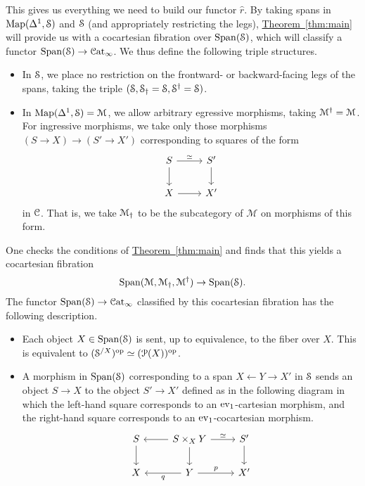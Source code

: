 \documentclass[main.tex]{subfiles}
\begin{document}
This gives us everything we need to build our functor $\hat{r}$. By taking spans in $\Map(\Delta^{1}, \S)$ and $\S$ (and appropriately restricting the legs), \hyperref[thm:main]{Theorem~\ref*{thm:main}} will provide us with a cocartesian fibration over $\Span(\S)$, which will classify a functor $\Span(\S) \to \ICat$. We thus define the following triple structures.
\begin{itemize}
  \item In $\S$, we place no restriction on the frontward- or backward-facing legs of the spans, taking the triple $(\S, \S\downdag = \S, \S\updag = \S)$.

  \item In $\Map(\Delta^{1}, \S) = \mathcal{M}$, we allow arbitrary egressive morphisms, taking $\category{M}\updag = \category{M}$. For ingressive morphisms, we take only those morphisms $(S \to X) \to (S' \to X')$ corresponding to squares of the form
    \begin{equation*}
      \begin{tikzcd}
        S
        \arrow[r, "\simeq"]
        \arrow[d]
        & S'
        \arrow[d]
        \\
        X
        \arrow[r]
        & X'
      \end{tikzcd}
    \end{equation*}
    in $\category{C}$. That is, we take $\mathcal{M}\downdag$ to be the subcategory of $\mathcal{M}$ on morphisms of this form.
\end{itemize}

One checks the conditions of \hyperref[thm:main]{Theorem~\ref*{thm:main}} and finds that this yields a cocartesian fibration
\begin{equation*}
  \Span\triple{M} \to \Span(\S).
\end{equation*}
The functor $\Span(\S) \to \ICat$ classified by this cocartesian fibration has the following description.
\begin{itemize}
  \item Each object $X \in \Span(\S)$ is sent, up to equivalence, to the fiber over $X$. This is equivalent to $(\S^{/X})\op \simeq (\P(X))\op$.

  \item A morphism in $\Span(\S)$ corresponding to a span $X \leftarrow Y \rightarrow X'$ in $\S$ sends an object $S \to X$ to the object $S' \to X'$ defined as in the following diagram in which the left-hand square corresponds to an $\ev_{1}$-cartesian morphism, and the right-hand square corresponds to an $\ev_{1}$-cocartesian morphism.
    \begin{equation*}
      \begin{tikzcd}
        S
        \arrow[d]
        & S \times_{X} Y
        \arrow[l]
        \arrow[r, "\simeq"]
        \arrow[d]
        & S'
        \arrow[d]
        \\
        X
        & Y
        \arrow[l, "q"]
        \arrow[r, "p"]
        & X'
      \end{tikzcd}
    \end{equation*}
\end{itemize}
\end{document}
